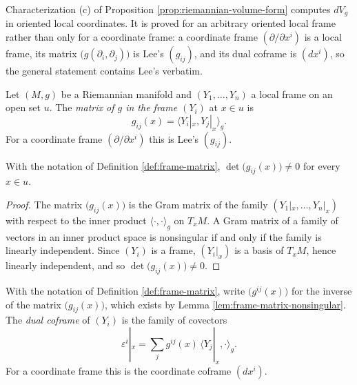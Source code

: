 Characterization (c) of Proposition \ref{prop:riemannian-volume-form} computes $dV_g$ in oriented
local coordinates. It is proved for an arbitrary oriented local frame rather than only for a
coordinate frame: a coordinate frame $(\partial/\partial x^i)$ is a local frame, its matrix
$\bigl(g(\partial_i,\partial_j)\bigr)$ is Lee's $(g_{ij})$, and its dual coframe is $(dx^i)$, so
the general statement contains Lee's verbatim.

\begin{definition}
\label{def:frame-matrix}
\leanok
Let $(M,g)$ be a Riemannian manifold and $(Y_1,\ldots,Y_n)$ a local frame on an open set $u$. The
\emph{matrix of $g$ in the frame $(Y_i)$} at $x \in u$ is
\[
g_{ij}(x) = \langle Y_i|_x, Y_j|_x \rangle_g .
\]
For a coordinate frame $(\partial/\partial x^i)$ this is Lee's $(g_{ij})$.
\end{definition}

\begin{lemma}
\label{lem:frame-matrix-nonsingular}
\leanok
{}
With the notation of Definition \ref{def:frame-matrix}, $\det\bigl(g_{ij}(x)\bigr) \ne 0$ for
every $x \in u$.
\end{lemma}

\begin{proof}
\leanok
{}
The matrix $\bigl(g_{ij}(x)\bigr)$ is the Gram matrix of the family $(Y_1|_x,\ldots,Y_n|_x)$ with
respect to the inner product $\langle\cdot,\cdot\rangle_g$ on $T_x M$. A Gram matrix of a family
of vectors in an inner product space is nonsingular if and only if the family is linearly
independent. Since $(Y_i)$ is a frame, $(Y_i|_x)$ is a basis of $T_x M$, hence linearly
independent, and so $\det\bigl(g_{ij}(x)\bigr) \ne 0$.
\end{proof}

\begin{definition}
\label{def:dual-coframe}
\leanok
{}
With the notation of Definition \ref{def:frame-matrix}, write $\bigl(g^{ij}(x)\bigr)$ for the
inverse of the matrix $\bigl(g_{ij}(x)\bigr)$, which exists by Lemma
\ref{lem:frame-matrix-nonsingular}. The \emph{dual coframe} of $(Y_i)$ is the family of covectors
\[
\varepsilon^i|_x = \sum_{j} g^{ij}(x) \, \langle Y_j|_x, \cdot \rangle_g .
\]
For a coordinate frame this is the coordinate coframe $(dx^i)$.
\end{definition}

